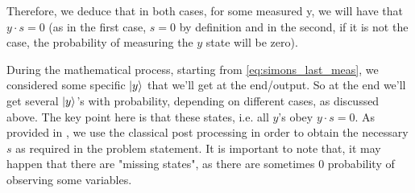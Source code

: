 Therefore, we deduce that in both cases, for some measured y, we will have that \underline{$y\cdot s =0$} (as in the first case, $s=0$ by definition and in the second, 
if it is not the case, the probability of measuring the $y$ state will be zero).

During the mathematical process, starting from \autoref{eq:simons_last_meas}, we considered some specific $\ket{y}$ that we'll get at the end/output.
So at the end we'll get several $\ket{y}$'s with probability, depending on different cases, as discussed above. The key point here is that 
these states, i.e. all $y$'s obey $y\cdot s = 0$.
As provided in \cite{noauthor_simons_2023}, we use the classical post processing in order to obtain the necessary $s$ as required in the problem statement.
It is important to note that, it may happen that there are "missing states", as there are sometimes 0 probability of observing some variables. 











